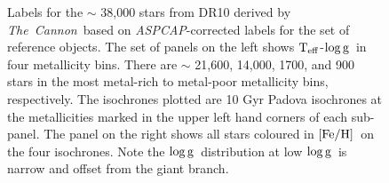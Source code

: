 \documentclass[12pt, preprint]{aastex}
\newcommand{\teff}{\mbox{$\rm T_{eff}$}}
\newcommand{\feh}{\mbox{$\rm [Fe/H]$}}
\newcommand{\logg}{\mbox{$\rm \log g$}}
\newcommand{\tc}{\textsl{The~Cannon}}
\newcommand{\aspcap}{\textsl{ASPCAP}}
\begin{document}
\begin{figure}[!h]
\caption{Labels for the $\sim$ 38,000 stars from DR10 derived by \tc\ based on \aspcap-corrected labels for the set of reference objects. The set of panels on the left shows \teff-\logg\ in four metallicity bins. There are $\sim$ 21,600, 14,000, 1700, and 900 stars in the most metal-rich to metal-poor metallicity bins, respectively. The isochrones plotted are 10 Gyr Padova isochrones at the metallicities marked in the upper left hand corners of each sub-panel.  The panel on the right shows all stars coloured in \feh\ on the four isochrones. Note the \logg\ distribution at low \logg\ is narrow and offset from the giant branch. }
\label{fig:iso}
\end{figure}


\begin{figure}[!h]
\centering


\end{figure}
\end{document}
